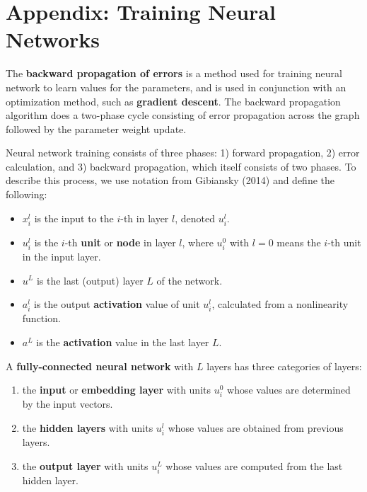 
\section{Appendix: Training Neural Networks} \label{app:Appendix_Backprop}

The \textbf{backward propagation of errors} is a method used for training neural network to learn values for the parameters, and is used in conjunction with an optimization method, such as \textbf{gradient descent}. The backward propagation algorithm does a two-phase cycle consisting of error propagation across the graph followed by the parameter weight update.

Neural network training consists of three phases: 1) forward propagation, 2) error calculation, and 3) backward propagation, which itself consists of two phases. To describe this process, we use notation from Gibiansky (2014) and define the following:

\begin{itemize}
    \item $x_i^l$ is the input to the $i$-th in layer $l$, denoted $u_i^l$.
    
    \item $u_i^l$ is the $i$-th \textbf{unit} or \textbf{node} in layer $l$, where $u_i^0$ with $l=0$ means the $i$-th unit in the input layer.
    
    \item $u^L$ is the last (output) layer $L$ of the network.
    
    \item $a_i^l$ is the output \textbf{activation} value of unit $u_i^l$, calculated from a nonlinearity function. 
    
    \item $a^L$ is the \textbf{activation} value in the last layer $L$.
    
\end{itemize}


A \textbf{fully-connected neural network} with $L$ layers has three categories of layers: 

\begin{enumerate}
    \item the \textbf{input } or \textbf{embedding layer} with units $u_i^0$ whose values are determined by the input vectors.
    
    \item the \textbf{hidden layers} with units $u_i^l$ whose values are obtained from previous layers.
    
    \item the \textbf{output layer} with units $u_i^L$ whose values are computed from the last hidden layer.
\end{enumerate} 

